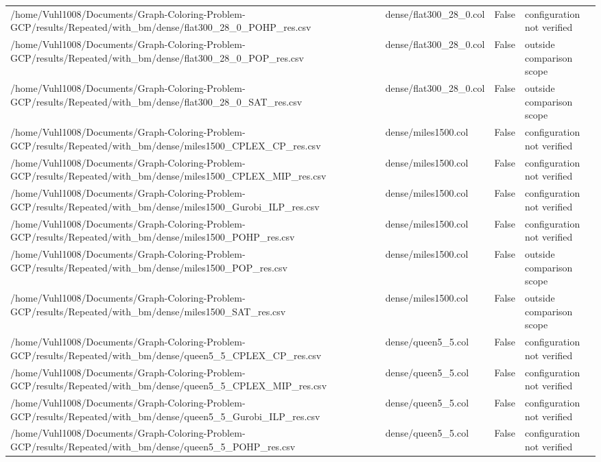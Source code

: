 \begin{table}[htbp]
\begin{tabular}{llll}
/home/Vuhl1008/Documents/Graph-Coloring-Problem-GCP/results/Repeated/with\_bm/dense/flat300\_28\_0\_POHP\_res.csv & dense/flat300\_28\_0.col & False & configuration not verified \\
/home/Vuhl1008/Documents/Graph-Coloring-Problem-GCP/results/Repeated/with\_bm/dense/flat300\_28\_0\_POP\_res.csv & dense/flat300\_28\_0.col & False & outside comparison scope \\
/home/Vuhl1008/Documents/Graph-Coloring-Problem-GCP/results/Repeated/with\_bm/dense/flat300\_28\_0\_SAT\_res.csv & dense/flat300\_28\_0.col & False & outside comparison scope \\
/home/Vuhl1008/Documents/Graph-Coloring-Problem-GCP/results/Repeated/with\_bm/dense/miles1500\_CPLEX\_CP\_res.csv & dense/miles1500.col & False & configuration not verified \\
/home/Vuhl1008/Documents/Graph-Coloring-Problem-GCP/results/Repeated/with\_bm/dense/miles1500\_CPLEX\_MIP\_res.csv & dense/miles1500.col & False & configuration not verified \\
/home/Vuhl1008/Documents/Graph-Coloring-Problem-GCP/results/Repeated/with\_bm/dense/miles1500\_Gurobi\_ILP\_res.csv & dense/miles1500.col & False & configuration not verified \\
/home/Vuhl1008/Documents/Graph-Coloring-Problem-GCP/results/Repeated/with\_bm/dense/miles1500\_POHP\_res.csv & dense/miles1500.col & False & configuration not verified \\
/home/Vuhl1008/Documents/Graph-Coloring-Problem-GCP/results/Repeated/with\_bm/dense/miles1500\_POP\_res.csv & dense/miles1500.col & False & outside comparison scope \\
/home/Vuhl1008/Documents/Graph-Coloring-Problem-GCP/results/Repeated/with\_bm/dense/miles1500\_SAT\_res.csv & dense/miles1500.col & False & outside comparison scope \\
/home/Vuhl1008/Documents/Graph-Coloring-Problem-GCP/results/Repeated/with\_bm/dense/queen5\_5\_CPLEX\_CP\_res.csv & dense/queen5\_5.col & False & configuration not verified \\
/home/Vuhl1008/Documents/Graph-Coloring-Problem-GCP/results/Repeated/with\_bm/dense/queen5\_5\_CPLEX\_MIP\_res.csv & dense/queen5\_5.col & False & configuration not verified \\
/home/Vuhl1008/Documents/Graph-Coloring-Problem-GCP/results/Repeated/with\_bm/dense/queen5\_5\_Gurobi\_ILP\_res.csv & dense/queen5\_5.col & False & configuration not verified \\
/home/Vuhl1008/Documents/Graph-Coloring-Problem-GCP/results/Repeated/with\_bm/dense/queen5\_5\_POHP\_res.csv & dense/queen5\_5.col & False & configuration not verified \\

\end{tabular}
\end{table}
